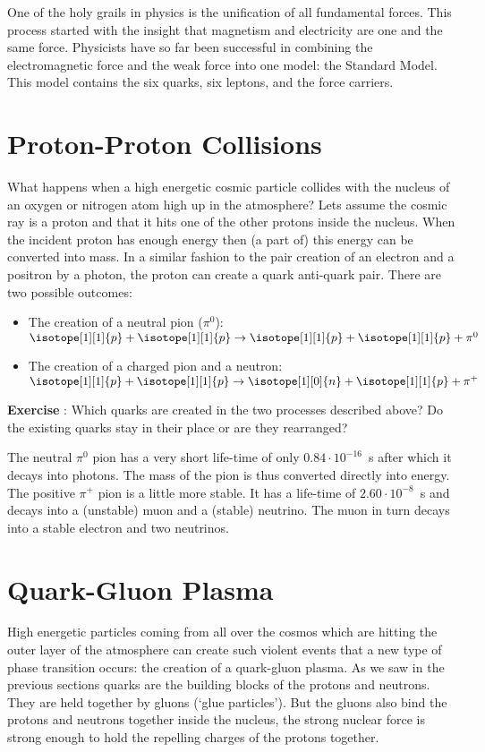 One of the holy grails in physics is the unification of all fundamental forces. This process started with the insight that magnetism and electricity are one and the same force. Physicists have so far been successful in combining the electromagnetic force and the weak force into one model: the Standard Model. This model contains the six quarks, six leptons, and the force carriers.

\section{Proton-Proton Collisions}
What happens when a high energetic cosmic particle collides with the nucleus of an oxygen or nitrogen atom high up in the atmosphere? Lets assume the cosmic ray is a proton and that it hits one of the other protons inside the nucleus. When the incident proton has enough energy then (a part of) this energy can be converted into mass. In a similar fashion to the pair creation of an electron and a positron by a photon, the proton can create a quark anti-quark pair. There are two possible outcomes:
\begin{itemize}
\item The creation of a neutral pion ($\pi^ 0$): $\isotope[1][1]{p} + \isotope[1][1]{p} \rightarrow \isotope[1][1]{p} + \isotope[1][1]{p} + \pi^0$
\item The creation of a charged pion and a neutron: $\isotope[1][1]{p} + \isotope[1][1]{p} \rightarrow \isotope[1][0]{n} + \isotope[1][1]{p} + \pi^+$
\end{itemize}

\begin{shaded}
\textbf{Exercise \theExercise {}} : Which quarks are created in the two processes described above? Do the existing quarks stay in their place or are they rearranged? \end{shaded}

The neutral $\pi^0$ pion has a very short life-time of only $0.84 \cdot 10^{-16}$~s after which it decays into photons. The mass of the pion is thus converted directly into energy. The positive $\pi^+$ pion is a little more stable. It has a life-time of $2.60 \cdot 10^{-8}$~s and decays into a (unstable) muon and a (stable) neutrino. The muon in turn decays into a stable electron and two neutrinos.

\section{Quark-Gluon Plasma}
High energetic particles coming from all over the cosmos which are hitting the outer layer of the atmosphere can create such violent events that a new type of phase transition occurs: the creation of a quark-gluon plasma. As we saw in the previous sections quarks are the building blocks of the protons and neutrons. They are held together by gluons (`glue particles'). But the gluons also bind the protons and neutrons together inside the nucleus, the strong nuclear force is strong enough to hold the repelling charges of the protons together.

